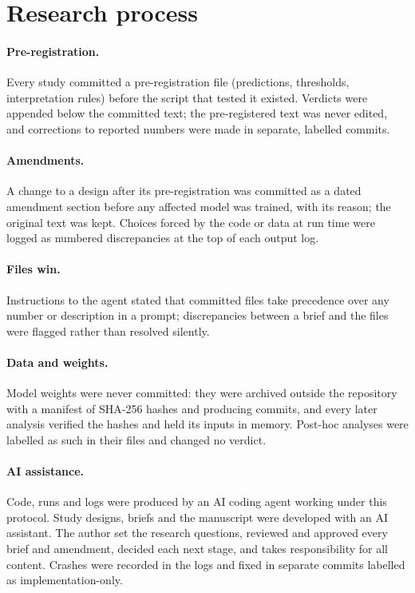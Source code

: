 \section{Research process}\label{app:process}

\paragraph{Pre-registration.} Every study committed a pre-registration file (predictions, thresholds, interpretation rules) before the script that tested it existed. Verdicts were appended below the committed text; the pre-registered text was never edited, and corrections to reported numbers were made in separate, labelled commits.
\paragraph{Amendments.} A change to a design after its pre-registration was committed as a dated amendment section before any affected model was trained, with its reason; the original text was kept. Choices forced by the code or data at run time were logged as numbered discrepancies at the top of each output log.
\paragraph{Files win.} Instructions to the agent stated that committed files take precedence over any number or description in a prompt; discrepancies between a brief and the files were flagged rather than resolved silently.
\paragraph{Data and weights.} Model weights were never committed: they were archived outside the repository with a manifest of SHA-256 hashes and producing commits, and every later analysis verified the hashes and held its inputs in memory. Post-hoc analyses were labelled as such in their files and changed no verdict.
\paragraph{AI assistance.} Code, runs and logs were produced by an AI coding agent working under this protocol. Study designs, briefs and the manuscript were developed with an AI assistant. The author set the research questions, reviewed and approved every brief and amendment, decided each next stage, and takes responsibility for all content. Crashes were recorded in the logs and fixed in separate commits labelled as implementation-only.

